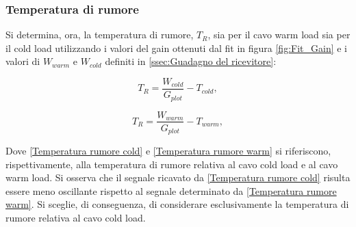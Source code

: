 \subsubsection{Temperatura di rumore}
Si determina, ora, la temperatura di rumore, $T_{R}$, sia per il cavo warm load sia per il cold load utilizzando i valori del gain ottenuti dal fit in figura \ref{fig:Fit_Gain} e i valori di $W_{warm}$ e $W_{cold}$ definiti in \ref{ssec:Guadagno del ricevitore}:
 
\begin{equation}
T_{R} = \dfrac{W_{cold}}{G_{plot}}-T_{cold},
\label{Temperatura rumore cold}
\end{equation}

\begin{equation}
T_{R} = \dfrac{W_{warm}}{G_{plot}}-T_{warm},
\label{Temperatura rumore warm}
\end{equation}

Dove \eqref{Temperatura rumore cold} e \eqref{Temperatura rumore warm} si riferiscono, rispettivamente, alla temperatura di rumore relativa al cavo cold load e al cavo warm load.
Si osserva che il segnale ricavato da \eqref{Temperatura rumore cold} risulta essere meno oscillante rispetto al segnale determinato da \eqref{Temperatura rumore warm}. Si sceglie, di conseguenza, di considerare esclusivamente la temperatura di rumore relativa al cavo cold load.

